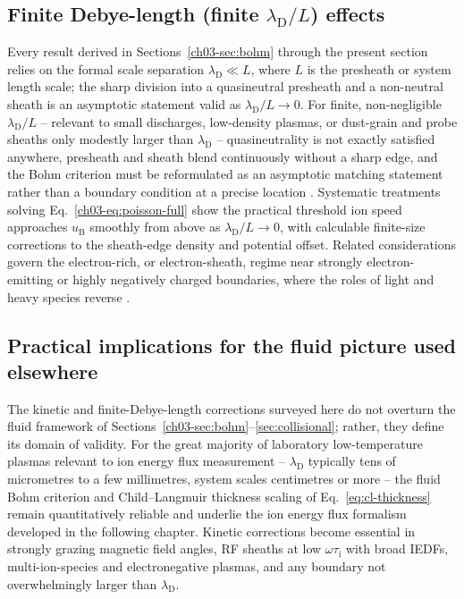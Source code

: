 \subsection{Finite Debye-length (finite $\lambda_{\mathrm{D}}/L$) effects}

Every result derived in Sections~\ref{ch03-sec:bohm} through the present section relies on the formal scale separation $\lambda_{\mathrm{D}} \ll L$, where $L$ is the presheath or system length scale; the sharp division into a quasineutral presheath and a non-neutral sheath is an asymptotic statement valid as $\lambda_{\mathrm{D}}/L \to 0$. For finite, non-negligible $\lambda_{\mathrm{D}}/L$ -- relevant to small discharges, low-density plasmas, or dust-grain and probe sheaths only modestly larger than $\lambda_{\mathrm{D}}$ -- quasineutrality is not exactly satisfied anywhere, presheath and sheath blend continuously without a sharp edge, and the Bohm criterion must be reformulated as an asymptotic matching statement rather than a boundary condition at a precise location \cite{ref0012}. Systematic treatments solving Eq.~\eqref{ch03-eq:poisson-full} show the practical threshold ion speed approaches $u_{\mathrm{B}}$ smoothly from above as $\lambda_{\mathrm{D}}/L \to 0$, with calculable finite-size corrections to the sheath-edge density and potential offset. Related considerations govern the electron-rich, or electron-sheath, regime near strongly electron-emitting or highly negatively charged boundaries, where the roles of light and heavy species reverse \cite{ref0006}.

\subsection{Practical implications for the fluid picture used elsewhere}

The kinetic and finite-Debye-length corrections surveyed here do not overturn the fluid framework of Sections~\ref{ch03-sec:bohm}--\ref{sec:collisional}; rather, they define its domain of validity. For the great majority of laboratory low-temperature plasmas relevant to ion energy flux measurement -- $\lambda_{\mathrm{D}}$ typically tens of micrometres to a few millimetres, system scales centimetres or more -- the fluid Bohm criterion and Child--Langmuir thickness scaling of Eq.~\eqref{eq:cl-thickness} remain quantitatively reliable and underlie the ion energy flux formalism developed in the following chapter. Kinetic corrections become essential in strongly grazing magnetic field angles, RF sheaths at low $\omega\tau_{\mathrm{i}}$ with broad IEDFs, multi-ion-species and electronegative plasmas, and any boundary not overwhelmingly larger than $\lambda_{\mathrm{D}}$.

